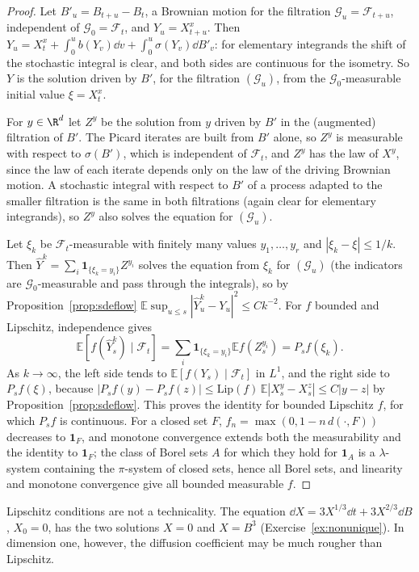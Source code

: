 \begin{proof}
Let $B'_u=B_{t+u}-B_t$, a Brownian motion for the filtration $\mathcal G_u=\mathcal F_{t+u}$, independent of $\mathcal G_0=\mathcal F_t$, and $Y_u=X^x_{t+u}$. Then
$Y_u=X^x_t+\int_0^ub(Y_v)\dd v+\int_0^u\sigma(Y_v)\dd B'_v$: for elementary integrands the shift of the stochastic integral is clear, and both sides are continuous for the isometry. So $Y$ is the solution
driven by $B'$, for the filtration $(\mathcal G_u)$, from the $\mathcal G_0$-measurable initial value $\xi=X^x_t$.

For $y\in\R^d$ let $Z^y$ be the solution from $y$ driven by $B'$ in the (augmented) filtration of $B'$. The Picard iterates are built from $B'$ alone, so $Z^y$ is measurable with respect to $\sigma(B')$, which is
independent of $\mathcal F_t$, and $Z^y$ has the law of $X^y$, since the law of each iterate depends only on the law of the driving Brownian motion. A stochastic integral with respect to $B'$ of a process
adapted to the smaller filtration is the same in both filtrations (again clear for elementary integrands), so $Z^y$ also solves the equation for $(\mathcal G_u)$.

Let $\xi_k$ be $\mathcal F_t$-measurable with finitely many values $y_1,\dots,y_r$ and $|\xi_k-\xi|\le1/k$. Then $\hat Y^k=\sum_i\mathbf 1_{\{\xi_k=y_i\}}Z^{y_i}$ solves the equation from $\xi_k$ for $(\mathcal G_u)$
(the indicators are $\mathcal G_0$-measurable and pass through the integrals), so by Proposition~\ref{prop:sdeflow} $\mathbb E\sup_{u\le s}|\hat Y^k_u-Y_u|^2\le Ck^{-2}$. For $f$ bounded and Lipschitz,
independence gives
\[
\mathbb E[f(\hat Y^k_s)\mid\mathcal F_t]=\sum_i\mathbf 1_{\{\xi_k=y_i\}}\mathbb E f(Z^{y_i}_s)=P_sf(\xi_k).
\]
As $k\to\infty$, the left side tends to $\mathbb E[f(Y_s)\mid\mathcal F_t]$ in $L^1$, and the right side to $P_sf(\xi)$, because $|P_sf(y)-P_sf(z)|\le\mathrm{Lip}(f)\,\mathbb E|X^y_s-X^z_s|\le C|y-z|$ by
Proposition~\ref{prop:sdeflow}. This proves the identity for bounded Lipschitz $f$, for which $P_sf$ is continuous. For a closed set $F$, $f_n=\max(0,1-n\,d(\cdot,F))$ decreases to $\mathbf 1_F$, and monotone convergence
extends both the measurability and the identity to $\mathbf 1_F$; the class of Borel sets $A$ for which they hold for $\mathbf 1_A$ is a $\lambda$-system containing the $\pi$-system of closed sets, hence all Borel sets,
and linearity and monotone convergence give all bounded measurable $f$.
\end{proof}

Lipschitz conditions are not a technicality. The equation $\dd X=3X^{1/3}\dd t+3X^{2/3}\dd B$, $X_0=0$, has the two solutions $X=0$ and $X=B^3$ (Exercise~\ref{ex:nonunique}). In dimension one, however,
the diffusion coefficient may be much rougher than Lipschitz.

